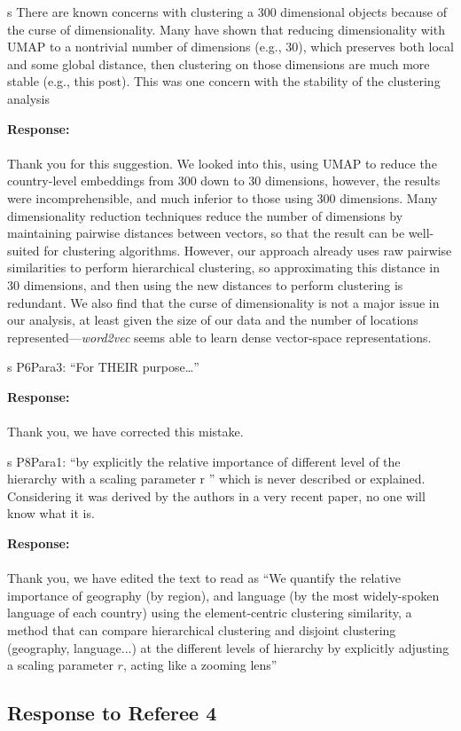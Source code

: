 \documentclass[12pt,a4paper]{article}
\newcounter{comment}[subsection]
\newcommand{\response}[1]{{\noindent \textbf{Response:} \\ \\ \noindent #1}}
\newcommand{\rcomment}[1]{%
\vspace{10pt}
\begin{sectionbox}
s #1
\end{sectionbox}
}
\begin{document}
\rcomment{
	There are known concerns with clustering a 300 dimensional objects because of the curse of
	dimensionality. Many have shown that reducing dimensionality with UMAP to a nontrivial
	number of dimensions (e.g., 30), which preserves both local and some global distance, then
	clustering on those dimensions are much more stable (e.g., this post). This was one
	concern with the stability of the clustering analysis


}

\response{Thank you for this suggestion.
	We looked into this, using UMAP to reduce the country-level embeddings from 300 down to 30 dimensions, however, the results were incomprehensible, and much inferior to those using 300 dimensions.
	Many dimensionality reduction techniques reduce the number of dimensions by maintaining pairwise distances between vectors, so that the result can be well-suited for clustering algorithms.
	However, our approach already uses raw pairwise similarities to perform hierarchical clustering, so approximating this distance in 30 dimensions, and then using the new distances to perform clustering is redundant.
	We also find that the curse of dimensionality is not a major issue in our analysis, at least given the size of our data and the number of locations represented---\textit{word2vec} seems able to learn dense vector-space representations.
}

\rcomment{
	P6Para3: “For THEIR purpose…”
}

\response{Thank you, we have corrected this mistake.
}

\rcomment{
	P8Para1: “by explicitly the relative importance of different level of the hierarchy with a scaling parameter r ” which is never described or explained. Considering it was derived by the authors in a very recent paper, no one will know what it is.
}

\response{Thank you, we have edited the text to read as “We quantify the relative importance of geography (by region), and language (by the most widely-spoken language of each country) using the element-centric clustering similarity, a method that can compare hierarchical clustering and disjoint clustering (geography, language...) at the different levels of hierarchy by explicitly adjusting a scaling parameter $r$, acting like a zooming lens”
}


%
%
\clearpage
\setcounter{section}{3}
\subsection{Response to Referee 4}
\setcounter{section}{4}
\end{document}
